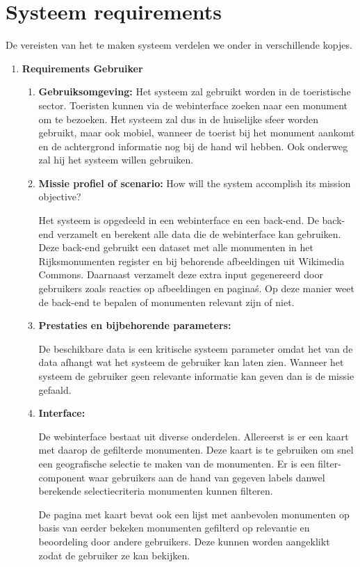 \documentclass{article}
\begin{document}
\section{Systeem requirements}
De vereisten van het te maken systeem verdelen we onder in verschillende kopjes.
\begin{enumerate}
	
	\item{\textbf{Requirements Gebruiker}}
	\begin{enumerate}
		\item{\textbf{Gebruiksomgeving:}}		
		Het systeem zal gebruikt worden in de toeristische sector. Toeristen kunnen via de webinterface zoeken naar een monument om te bezoeken. Het systeem zal dus in de huiselijke sfeer worden gebruikt, maar ook mobiel, wanneer de toerist bij het monument aankomt en de achtergrond informatie nog bij de hand wil hebben. Ook onderweg zal hij het systeem willen gebruiken.
		\item{\textbf{Missie profiel of scenario:}} How will the system accomplish its mission objective? 
		
		Het systeem is opgedeeld in een webinterface en een back-end. De back-end verzamelt en berekent alle data die de webinterface kan gebruiken. Deze back-end gebruikt een dataset met alle monumenten in het Rijksmonumenten register en bij behorende afbeeldingen uit Wikimedia Commons. Daarnaast verzamelt deze extra input gegenereerd door gebruikers zoals reacties op afbeeldingen en pagina\'s. Op deze manier weet de back-end te bepalen of monumenten relevant zijn of niet. 
		
		\item{\textbf{Prestaties en bijbehorende parameters:}}
		
		De beschikbare data is een kritische systeem parameter omdat het van de data afhangt wat het systeem de gebruiker kan laten zien. Wanneer het systeem de gebruiker geen relevante informatie kan geven dan is de missie gefaald.
		
		\item{\textbf{Interface:}}
		
		De webinterface bestaat uit diverse onderdelen. Allereerst is er een kaart met daarop de gefilterde monumenten. Deze kaart is te gebruiken om snel een geografische selectie te maken van de monumenten. Er is een filter-component waar gebruikers aan de hand van gegeven labels danwel berekende selectiecriteria monumenten kunnen filteren. 
		
		De pagina met kaart bevat ook een lijst met aanbevolen monumenten op basis van eerder bekeken monumenten gefilterd op relevantie en beoordeling door andere gebruikers. Deze kunnen worden aangeklikt zodat de gebruiker ze kan bekijken.
		

\end{enumerate}
\end{enumerate}
\end{document}
